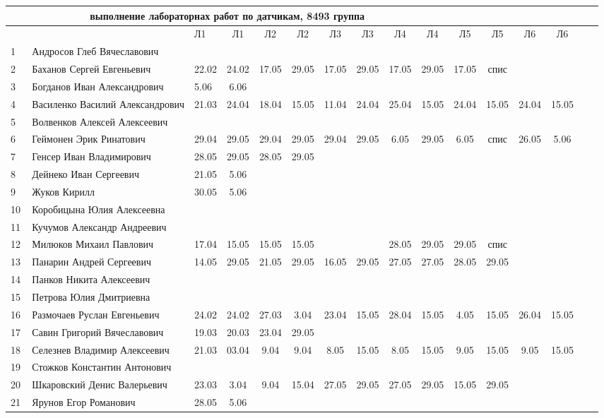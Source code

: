 \newpage
%
\begin{tabular}{l|llccccccccccccc}
\multicolumn{10}{c}{выполнение лабораторнах работ по датчикам, 8493 группа} \\
\toprule
&&Л1&Л1& Л2&Л2& Л3&Л3& Л4&Л4 &Л5&Л5& Л6&Л6\\
\midrule
1\,&  Андросов Глеб Вячеславович      &      &      &&&&&&\\
2\,&  Баханов Сергей Евгеньевич       & 22.02& 24.02&17.05&29.05& 17.05&29.05& 17.05& 29.05& 17.05 & спис \\
3\,&  Богданов Иван Александрович     &  5.06&  6.06&&&&&&\\
4\,&  Василенко Василий Александрович & 21.03& 24.04& 18.04& 15.05&11.04&24.04&25.04&15.05&24.04&15.05& 24.04&15.05\\
5\,&  Волвенков Алексей Алексеевич    &      &      &&&&&&\\
\midrule                                            
6\,&  Геймонен Эрик Ринатович         & 29.04 & 29.05 & 29.04 & 29.05 & 29.04 & 29.05 & 6.05 & 29.05 &6.05&спис & 26.05& 5.06\\
7\,&  Генсер Иван Владимирович        & 28.05& 29.05&28.05& 29.05&&&&\\
8\,&  Дейнеко Иван Сергеевич          & 21.05&  5.06&&&&&&\\
9\,&  Жуков Кирилл                    & 30.05&  5.06&&&&&&\\
10\,& Коробицына Юлия Алексеевна      &      &      &&&&&&\\
\midrule                                            
11\,& Кучумов Александр Андреевич     &      &      &&&&&&\\
12\,& Милюков Михаил Павлович         &17.04 & 15.05&15.05&15.05&&&28.05&29.05&29.05& спис\\
13\,& Панарин Андрей Сергеевич        &14.05 & 29.05& 21.05& 29.05 & 16.05&29.05&27.05&27.05&28.05&29.05\\
14\,& Панков Никита Алексеевич        &      &      &&&&&&\\
15\,& Петрова Юлия Дмитриевна         &      &      &&&&&&\\
\midrule                                            
16\,& Размочаев Руслан Евгеньевич     & 24.02& 24.02& 27.03&  3.04&23.04& 15.05& 28.04&15.05& 4.05& 15.05 & 26.04 & 15.05\\
17\,& Савин Григорий Вячеславович     & 19.03& 20.03& 23.04& 29.05&&&&\\
18\,& Селезнев Владимир Алексеевич    & 21.03& 03.04&  9.04& 9.04 & 8.05& 15.05& 8.05& 15.05 & 9.05& 15.05& 9.05& 15.05\\
19\,& Стожков Константин Антонович    &      &      &&&&&&\\
20\,& Шкаровский Денис Валерьевич     & 23.03& 3.04 & 9.04& 15.04& 27.05& 29.05 & 27.05& 29.05 & 15.05& 29.05\\
\midrule                                            
21\,& Ярунов Егор Романович           & 28.05& 5.06 &&&&&&\\
\bottomrule
\end{tabular}

